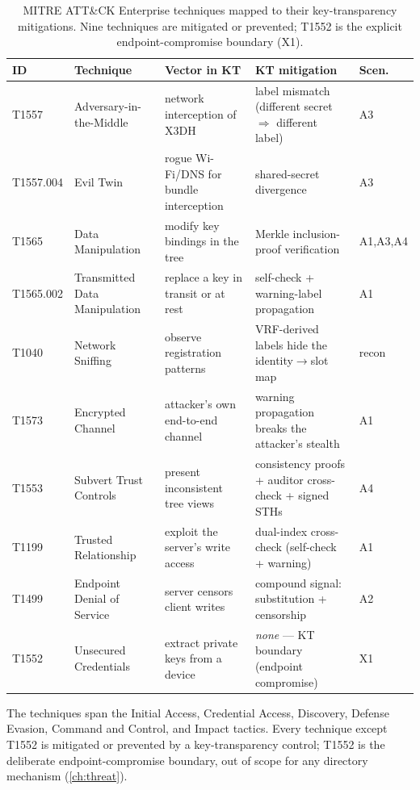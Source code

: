\begin{table}[ht]
\centering
\caption{MITRE ATT\&CK Enterprise techniques mapped to their key-transparency mitigations. Nine
techniques are mitigated or prevented; T1552 is the explicit endpoint-compromise boundary (X1).}
\label{tab:sec-mitre}
\footnotesize
\begin{tabular}{@{}p{1.05cm}p{2.4cm}p{3.3cm}p{4.6cm}l@{}}
\toprule
ID & Technique & Vector in KT & KT mitigation & Scen. \\
\midrule
T1557 & Adversary-in-the-Middle & network interception of X3DH & label mismatch (different secret $\Rightarrow$ different label) & A3 \\
T1557.004 & Evil Twin & rogue Wi-Fi/DNS for bundle interception & shared-secret divergence & A3 \\
T1565 & Data Manipulation & modify key bindings in the tree & Merkle inclusion-proof verification & A1,A3,A4 \\
T1565.002 & Transmitted Data Manipulation & replace a key in transit or at rest & self-check + warning-label propagation & A1 \\
T1040 & Network Sniffing & observe registration patterns & VRF-derived labels hide the identity$\to$slot map & recon \\
T1573 & Encrypted Channel & attacker's own end-to-end channel & warning propagation breaks the attacker's stealth & A1 \\
T1553 & Subvert Trust Controls & present inconsistent tree views & consistency proofs + auditor cross-check + signed STHs & A4 \\
T1199 & Trusted Relationship & exploit the server's write access & dual-index cross-check (self-check + warning) & A1 \\
T1499 & Endpoint Denial of Service & server censors client writes & compound signal: substitution + censorship & A2 \\
T1552 & Unsecured Credentials & extract private keys from a device & \emph{none} --- KT boundary (endpoint compromise) & X1 \\
\bottomrule
\end{tabular}
\end{table}

The techniques span the Initial Access, Credential Access, Discovery, Defense Evasion, Command and
Control, and Impact tactics. Every technique except T1552 is mitigated or prevented by a
key-transparency control; T1552 is the deliberate endpoint-compromise boundary, out of scope for any
directory mechanism (\cref{ch:threat}).

